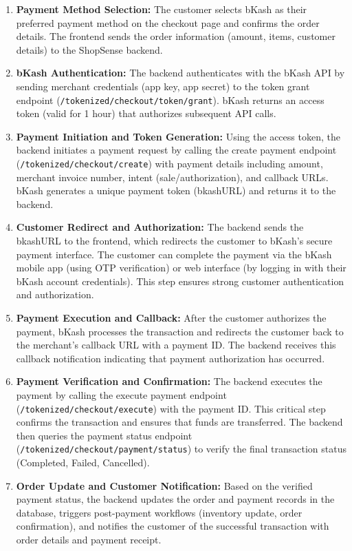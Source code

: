 \begin{enumerate}[label=\roman*.]
  \item \textbf{Payment Method Selection:} The customer selects bKash as their preferred payment method on the checkout page and confirms the order details. The frontend sends the order information (amount, items, customer details) to the ShopSense backend.
  
  \item \textbf{bKash Authentication:} The backend authenticates with the bKash API by sending merchant credentials (app key, app secret) to the token grant endpoint (\texttt{/tokenized/checkout/token/grant}). bKash returns an access token (valid for 1 hour) that authorizes subsequent API calls.
  
  \item \textbf{Payment Initiation and Token Generation:} Using the access token, the backend initiates a payment request by calling the create payment endpoint (\texttt{/tokenized/checkout/create}) with payment details including amount, merchant invoice number, intent (sale/authorization), and callback URLs. bKash generates a unique payment token (bkashURL) and returns it to the backend.
  
  \item \textbf{Customer Redirect and Authorization:} The backend sends the bkashURL to the frontend, which redirects the customer to bKash's secure payment interface. The customer can complete the payment via the bKash mobile app (using OTP verification) or web interface (by logging in with their bKash account credentials). This step ensures strong customer authentication and authorization.
  
  \item \textbf{Payment Execution and Callback:} After the customer authorizes the payment, bKash processes the transaction and redirects the customer back to the merchant's callback URL with a payment ID. The backend receives this callback notification indicating that payment authorization has occurred.
  
  \item \textbf{Payment Verification and Confirmation:} The backend executes the payment by calling the execute payment endpoint (\texttt{/tokenized/checkout/execute}) with the payment ID. This critical step confirms the transaction and ensures that funds are transferred. The backend then queries the payment status endpoint (\texttt{/tokenized/checkout/payment/status}) to verify the final transaction status (Completed, Failed, Cancelled).
  
  \item \textbf{Order Update and Customer Notification:} Based on the verified payment status, the backend updates the order and payment records in the database, triggers post-payment workflows (inventory update, order confirmation), and notifies the customer of the successful transaction with order details and payment receipt.
\end{enumerate}

